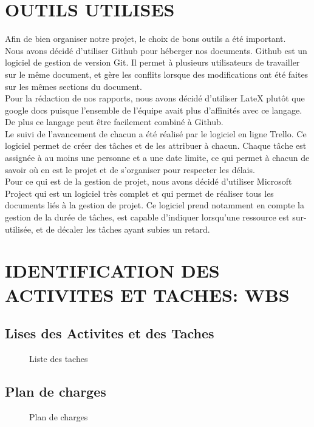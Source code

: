 \documentclass[]{scrartcl}
\begin{document}
\section{OUTILS UTILISES}
Afin de bien organiser notre projet, le choix de bons outils a été important. \\
Nous avons décidé d'utiliser Github pour héberger nos documents. Github est un logiciel de gestion de version Git. Il permet à plusieurs utilisateurs de travailler sur le même document, et gère les conflits lorsque des modifications ont été faites sur les mêmes sections du document. \\
Pour la rédaction de nos rapports, nous avons décidé d'utiliser LateX plutôt que google docs puisque l'ensemble de l'équipe avait plus d'affinités avec ce langage. De plus ce langage peut être facilement combiné à Github. \\
Le suivi de l'avancement de chacun a été réalisé par le logiciel en ligne Trello. Ce logiciel permet de créer des tâches et de les attribuer à chacun. Chaque tâche est assignée à au moins une personne et a une date limite, ce qui permet à chacun de savoir où en est le projet et de s'organiser pour respecter les délais. \\

Pour ce qui est de la gestion de projet, nous avons décidé d'utiliser Microsoft Project qui est un logiciel très complet et qui permet de réaliser tous les documents liés à la gestion de projet. Ce logiciel prend notamment en compte la gestion de la durée de tâches, est capable d'indiquer lorsqu'une ressource est sur-utilisée, et de décaler les tâches ayant subies un retard. 

\section{IDENTIFICATION DES ACTIVITES ET TACHES: WBS}
\subsection{Lises des Activites et des Taches}
\begin{center}
\begin{figure}[H]
\caption{Liste des taches}
\end{figure}
\end{center}
\subsection{Plan de charges}
\begin{center}
\begin{figure}[H]
\caption{Plan de charges}
\end{figure}
\end{center}
\end{document}
